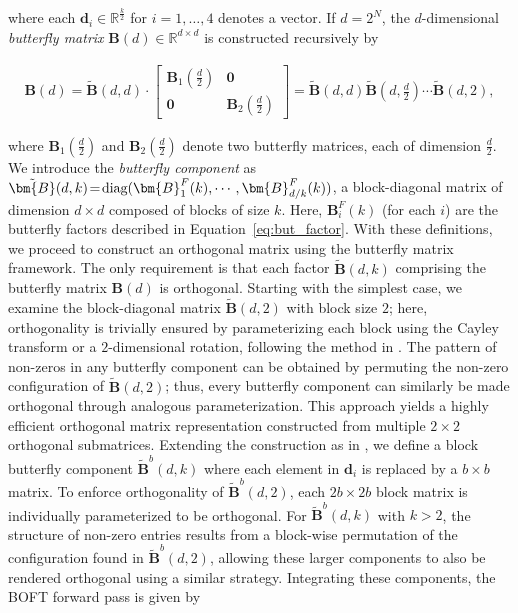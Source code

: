 where each $\bm{d}_i\in\mathbb{R}^{\frac{k}{2}}$ for $i=1,\dots,4$ denotes a vector. If $d=2^N$, the $d$-dimensional \emph{butterfly matrix} $\bm{B}(d)\in\mathbb{R}^{d\times d}$ is constructed recursively by

\begin{equation}
\begin{aligned}
    \bm{B}(d)=\tilde{\bm{B}}(d,d)\!\cdot\!\begin{bmatrix}
    \bm{B}_1(\frac{d}{2})\!\!\!\!\! & \bm{0} \\
    \bm{0}\!\!\!\!\! &\bm{B}_2(\frac{d}{2})
    \end{bmatrix}= \tilde{\bm{B}}(d,d)\tilde{\bm{B}}(d,\frac{d}{2})\cdots\tilde{\bm{B}}(d,2),
\end{aligned}
\end{equation}

where $\bm{B}_1(\frac{d}{2})$ and $\bm{B}_2(\frac{d}{2})$ denote two butterfly matrices, each of dimension $\frac{d}{2}$. We introduce the \emph{butterfly component} as $\thickmuskip=2mu \medmuskip=2mu \tilde{\bm{B}}(d,k)=\text{diag}(\bm{B}^F_1(k),\cdots,\bm{B}^F_{d/k}(k))$, a block-diagonal matrix of dimension $d \times d$ composed of blocks of size $k$. Here, $\bm{B}^F_i(k)$ (for each $i$) are the butterfly factors described in Equation~\ref{eq:but_factor}. With these definitions, we proceed to construct an orthogonal matrix using the butterfly matrix framework. The only requirement is that each factor $\tilde{\bm{B}}(d,k)$ comprising the butterfly matrix $\bm{B}(d)$ is orthogonal. Starting with the simplest case, we examine the block-diagonal matrix $\tilde{\bm{B}}(d,2)$ with block size $2$; here, orthogonality is trivially ensured by parameterizing each block using the Cayley transform or a $2$-dimensional rotation, following the method in \cite{liu2021orthogonal,qiu2023controlling}. The pattern of non-zeros in any butterfly component can be obtained by permuting the non-zero configuration of $\tilde{\bm{B}}(d,2)$; thus, every butterfly component can similarly be made orthogonal through analogous parameterization. This approach yields a highly efficient orthogonal matrix representation constructed from multiple $2\times 2$ orthogonal submatrices. Extending the construction as in \cite{chen2022pixelated}, we define a block butterfly component $\tilde{\bm{B}}^b(d,k)$ where each element in $\bm{d}_i$ is replaced by a $b\times b$ matrix. To enforce orthogonality of $\tilde{\bm{B}}^b(d,2)$, each $2b\times 2b$ block matrix is individually parameterized to be orthogonal. For $\tilde{\bm{B}}^b(d,k)$ with $k>2$, the structure of non-zero entries results from a block-wise permutation of the configuration found in $\tilde{\bm{B}}^b(d,2)$, allowing these larger components to also be rendered orthogonal using a similar strategy. Integrating these components, the BOFT forward pass is given by

